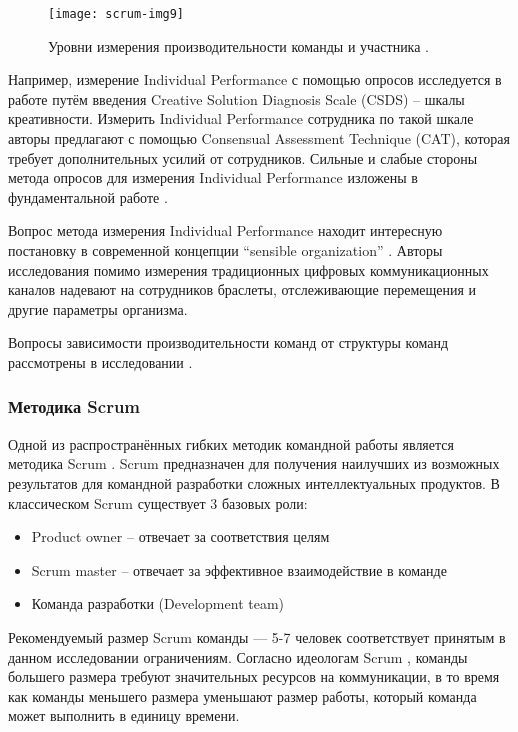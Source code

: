 \begin{figure}[H]
  \centering
    \texttt{[image: scrum-img9]}
  \label{ex:fig9}
  \caption{Уровни измерения производительности команды и участника \cite{tims2013job}.}
\end{figure}  

Например, измерение Individual Performance с помощью опросов исследуется в работе \cite{cropley2012measuring} путём введения Creative Solution Diagnosis Scale (CSDS) -- шкалы креативности. 
Измерить Individual Performance сотрудника по такой шкале авторы \cite{cropley2012measuring} предлагают с помощью Consensual Assessment Technique (CAT), которая требует дополнительных усилий от сотрудников.
Сильные и слабые стороны метода опросов для измерения Individual Performance изложены в фундаментальной работе \cite{jackson1965person}.

Вопрос метода измерения Individual Performance находит интересную постановку в современной концепции ``sensible organization'' \cite{olguin2008sensible}.
Авторы исследования \cite{olguin2008sensible} помимо измерения традиционных цифровых коммуникационных каналов надевают на сотрудников браслеты, отслеживающие перемещения и другие параметры организма.

Вопросы зависимости производительности команд от структуры команд рассмотрены в исследовании \cite{kradoya2016structure}.

\subsubsection{Методика Scrum}
Одной из распространённых гибких методик командной работы является методика Scrum \cite{sutherland2013scrum}. 
Scrum предназначен для получения наилучших из возможных результатов для командной разработки сложных интеллектуальных продуктов.
В классическом Scrum существует 3 базовых роли:

\begin{itemize}
\tightlist
\item  Product owner -- отвечает за соответствия целям
\item  Scrum master -- отвечает за эффективное взаимодействие в команде
\item  Команда разработки (Development team)
\end{itemize}

Рекомендуемый размер Scrum команды --- 5-7 человек соответствует принятым в данном исследовании ограничениям.
Согласно идеологам Scrum \cite{sutherland2013scrum}, команды большего размера требуют значительных ресурсов на коммуникации, в то время как команды меньшего размера уменьшают размер работы, который команда может выполнить в единицу времени.

